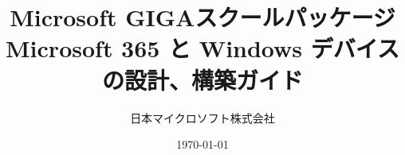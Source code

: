 \documentclass[a4paper,10pt,twocolumn]{jsbook}
\begin{document}
\title{\large Microsoft GIGAスクールパッケージ\\ \LARGE Microsoft 365 と Windows デバイスの設計、構築ガイド}
\date{\today}
\author{日本マイクロソフト株式会社}
\maketitle
\newpage

\newpage
\tableofcontents
\newpage




%
%
\end{document}
